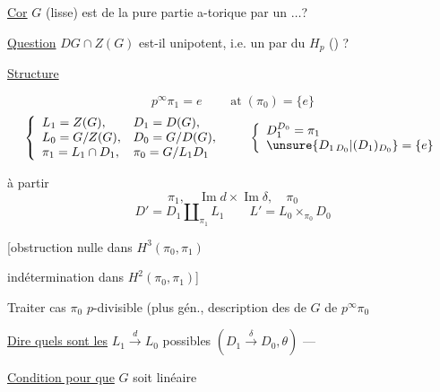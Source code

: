 \uline{Cor} $G$ (lisse) est   de la pure partie a-torique par un $\ldots$?

\uline{Question} $DG\cap Z(G)$ est-il  unipotent, i.e.
un  par du $H_p$ () ?

\uline{Structure}


\[
p^\infty\pi_1=e\qquad \operatorname{at}(\pi_0)=\{e\}
\]
\[
\left\{\begin{array}{ll}
L_1=Z(G),&D_1=D(G),\\
L_0=G/Z(G),&D_0=G/D(G),\\
\pi_1=L_1\cap D_1,&\pi_0=G/L_1D_1
\end{array}\right.
\qquad
\left\{\begin{array}{l}
D_1^{D_0}=\pi_1\\
\unsure{D_{1\,D_0}|(D_1)_{D_0}}=\{e\}
\end{array}\right.
\]

 à partir
\[
\pi_1,\quad \operatorname{Im}d\times\operatorname{Im}\delta,\quad \pi_0
\]
\[
D'=D_1\amalg_{\pi_1}L_1\qquad L'=L_0\times_{\pi_0}D_0
\]

[obstruction nulle dans $H^3(\pi_0,\pi_1)$

indétermination dans $H^2(\pi_0,\pi_1)$]

Traiter cas $\pi_0$ $p$-divisible (plus gén., description des
  de $G$  de $p^\infty\pi_0$

\uline{Dire quels sont les} $L_1\xrightarrow{d}L_0$ possibles
$(D_1\xrightarrow{\delta}D_0,\theta)$ ---

\uline{Condition pour que} $G$ soit linéaire
